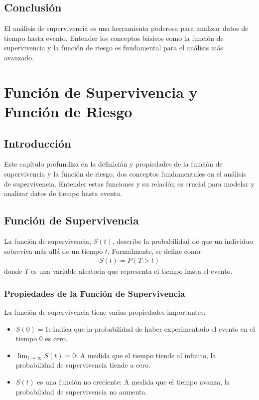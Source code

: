 \documentclass[a4paper]{report} %
\begin{document}
\section{Conclusi\'on}
El an\'alisis de supervivencia es una herramienta poderosa para analizar datos de tiempo hasta evento. Entender los conceptos b\'asicos como la funci\'on de supervivencia y la funci\'on de riesgo es fundamental para el an\'alisis m\'as avanzado.


\chapter{Funci\'on de Supervivencia y Funci\'on de Riesgo}
\section{Introducci\'on}
Este cap\'itulo profundiza en la definici\'on y propiedades de la funci\'on de supervivencia y la funci\'on de riesgo, dos conceptos fundamentales en el an\'alisis de supervivencia. Entender estas funciones y su relaci\'on es crucial para modelar y analizar datos de tiempo hasta evento.

\section{Funci\'on de Supervivencia}
La funci\'on de supervivencia, $S(t)$, describe la probabilidad de que un individuo sobreviva m\'as all\'a de un tiempo $t$. Formalmente, se define como:
\begin{eqnarray*}
S(t) = P(T > t)
\end{eqnarray*}
donde $T$ es una variable aleatoria que representa el tiempo hasta el evento.

\subsection{Propiedades de la Funci\'on de Supervivencia}
La funci\'on de supervivencia tiene varias propiedades importantes:
\begin{itemize}
    \item $S(0) = 1$: Indica que la probabilidad de haber experimentado el evento en el tiempo 0 es cero.
    \item $\lim_{t \to \infty} S(t) = 0$: A medida que el tiempo tiende al infinito, la probabilidad de supervivencia tiende a cero.
    \item $S(t)$ es una funci\'on no creciente: A medida que el tiempo avanza, la probabilidad de supervivencia no aumenta.
\end{itemize}
\end{document}
